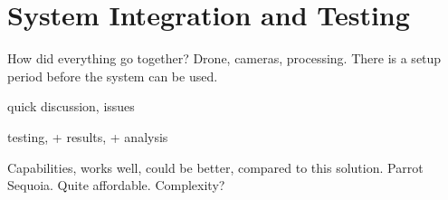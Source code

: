 \chapter{System Integration and Testing}

How did everything go together? Drone, cameras, processing. There is a setup period before the system can be used.

quick discussion, issues

testing, + results, + analysis

Capabilities, works well, could be better, compared to this solution. Parrot Sequoia. Quite affordable. Complexity?